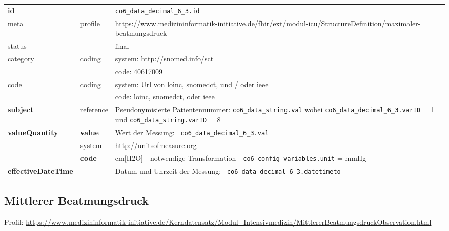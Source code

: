 \begin{longtable}{|l|l|p{7.5cm}|}
        \hline
        \rowcolor{lightgray} \multicolumn{3}{|l|}{Data Mapping (inhaltlich)} \\ \hline
        \textbf{id} &  & \texttt{co6\_data\_decimal\_6\_3.id} \\ \hline
	meta & profile & https://www.medizininformatik-initiative.de/fhir/ext/modul-icu/StructureDefinition/maximaler-beatmungsdruck \\ \hline 
	status &  & final   \\ \hline 
	category & coding & system: \url{http://snomed.info/sct} \\
\cline{3-3}
	& & code: 40617009 \\ \hline
	code & coding & system: Url von \ac{loinc}, \ac{snomedct}, und / oder \ac{ieee} \\ 
	\cline{3-3} 
	 &  & code: \ac{loinc}, \ac{snomedct}, oder \ac{ieee} \\ \hline
	 \textbf{subject} & reference & Pseudonymisierte Patientennummer: \texttt{co6\_data\_string.val} wobei \texttt{co6\_data\_decimal\_6\_3.varID} = 1 und \texttt{co6\_data\_string.varID} = 8 \\ \hline
	 \textbf{valueQuantity}  & \textbf{value} & Wert der Messung: \texttt{
co6\_data\_decimal\_6\_3.val} \\
        \cline{2-3}
         & system & http://unitsofmeasure.org \\
         \cline{2-3}
         & \textbf{code} & cm[H2O] - notwendige Transformation - \texttt{co6\_config\_variables.unit} = mmHg \\ \hline
     \textbf{effectiveDateTime}  & & Datum und Uhrzeit der Messung: \texttt{
co6\_data\_decimal\_6\_3.datetimeto} \\ \hline
\end{longtable}


\subsection{Mittlerer Beatmungsdruck} 

Profil: \url{https://www.medizininformatik-initiative.de/Kerndatensatz/Modul_Intensivmedizin/MittlererBeatmungsdruckObservation.html}

